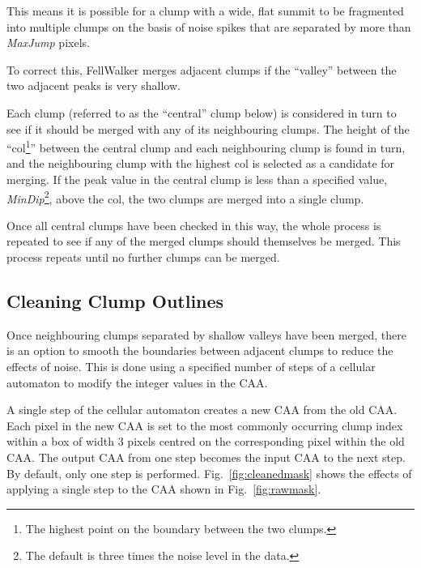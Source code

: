 \documentclass[final,authoryear,5p,times,twocolumn]{elsarticle}
\begin{document}
This means it is possible for a clump with a wide, flat summit to be
fragmented into multiple clumps on the basis of noise spikes that are
separated by more than \emph{MaxJump} pixels.

To correct this, FellWalker merges adjacent clumps if the ``valley''
between the two adjacent peaks is very shallow.

Each clump (referred to as the ``central'' clump below) is considered in
turn to see if it should be merged with any of its neighbouring clumps.
The height of the ``col\footnote{The highest point on the boundary
between the two clumps.}'' between the central clump and each
neighbouring clump is found in turn, and the neighbouring clump with the
highest col is selected as a candidate for merging. If the peak value in
the central clump is less than a specified value,
\emph{MinDip}\footnote{The default is three times the noise level in the
data.}, above the col, the two clumps are merged into a single clump.

Once all central clumps have been checked in this way, the whole process
is repeated to see if any of the merged clumps should themselves be
merged. This process repeats until no further clumps can be merged.

\subsection{Cleaning Clump Outlines}
\label{sec:cleaning}

Once neighbouring clumps separated by shallow valleys have been merged,
there is an option to smooth the boundaries between adjacent clumps to
reduce the effects of noise. This is done using a specified number of
steps of a cellular automaton to modify the integer values in the CAA.

A single step of the cellular automaton creates a new CAA from the old
CAA. Each pixel in the new CAA is set to the most commonly occurring
clump index within a box of width 3 pixels centred on the corresponding
pixel within the old CAA. The output CAA from one step becomes the input
CAA to the next step. By default, only one step is performed.
Fig.~\ref{fig:cleanedmask} shows the effects of applying a single step to
the CAA shown in Fig.~\ref{fig:rawmask}.
\end{document}
